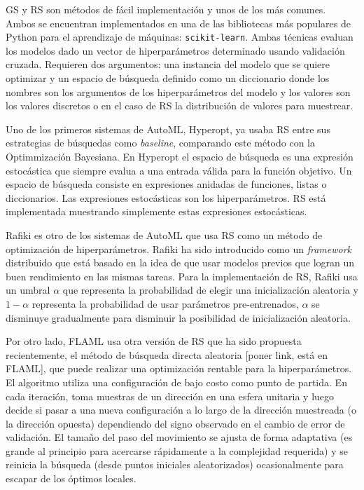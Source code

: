 GS y RS son métodos de fácil implementación y unos de los más comunes. Ambos se encuentran implementados en una de las bibliotecas más populares de Python para el aprendizaje de máquinas: \texttt{scikit-learn}. Ambas técnicas evaluan los modelos dado un vector de hiperparámetros determinado usando validación cruzada. Requieren dos argumentos: una instancia del modelo que se quiere optimizar y un espacio de búsqueda definido como un diccionario donde los nombres son los argumentos de los hiperparámetros del modelo y los valores son los valores discretos o en el caso de RS la distribución de valores para muestrear.

Uno de los primeros sistemas de AutoML, Hyperopt, ya usaba RS entre sus estrategias de búsquedas como \textit{baseline}, comparando este método con la Optimmización Bayesiana. En Hyperopt el espacio de búsqueda es una expresión estocástica que siempre evalua a una entrada válida para la función objetivo. Un espacio de búsqueda consiste en expresiones anidadas de funciones, listas o diccionarios. Las expresiones estocásticas son los hiperparámetros. RS está implementada muestrando simplemente estas expresiones estocásticas.

Rafiki es otro de los sistemas de AutoML que usa RS como un método de optimización de hiperparámetros. Rafiki ha sido introducido como un \textit{framework} distribuido que está basado en la idea de que usar modelos previos que logran un buen rendimiento en las mismas tareas. Para la implementación de RS, Rafiki usa un umbral $\alpha$ que representa la probabilidad de elegir una inicialización aleatoria y $1 - \alpha$ representa la probabilidad de usar parámetros pre-entrenados, $\alpha$ se disminuye gradualmente para disminuir la posibilidad de inicialización aleatoria.

Por otro lado, FLAML usa otra versión de RS que ha sido propuesta recientemente, el método de búsqueda directa aleatoria [poner link, está en FLAML], que puede realizar una optimización rentable para la hiperparámetros. El algoritmo utiliza una configuración de bajo costo como punto de partida. En cada iteración, toma muestras de un dirección en una esfera unitaria y luego decide si pasar a una nueva configuración a lo largo de la dirección muestreada (o la dirección opuesta) dependiendo del signo observado en el cambio de error de validación. El tamaño del paso del movimiento se ajusta de forma adaptativa (es grande al principio para acercarse rápidamente a la complejidad requerida) y se reinicia la búsqueda (desde puntos iniciales aleatorizados) ocasionalmente para escapar de los óptimos locales.

